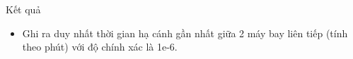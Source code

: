 Kết quả
\begin{itemize}
	\item     Ghi ra duy nhất thời gian hạ cánh gần nhất giữa 2 máy bay liên tiếp (tính theo phút) với độ chính xác là 1e-6.   
\end{itemize}
